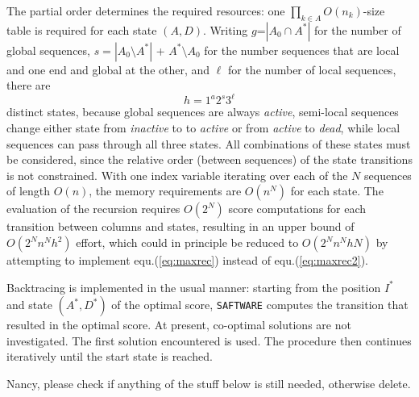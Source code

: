 \documentclass[a4paper,10pt]{article}
\newcommand{\TODO}[1]{\begingroup\color{red}#1\endgroup}
\newcommand{\PFS}[1]{\begingroup\color{green}#1\endgroup}
\newcommand{\SAFTWARE}{\TODO{\texttt{SAFTWARE}}}
\begin{document}
The partial order determines the required resources: one
$\prod_{k\in A} O(n_k)$-size table is required for each state $(A,D)$.
Writing $g$=$|A_0\cap A^*|$ for the number of global sequences,
$s=|A_0\setminus A^*|$ + $A^*\setminus A_0$ for the number sequences that
are local and one end and global at the other, and $\ell$ for the number of
local sequences, there are
\begin{equation}
  h = 1^a 2^s 3^{\ell} 
\end{equation} 
distinct states, because global sequences are always \textit{active},
semi-local sequences change either state from \textit{inactive} to to
\textit{active} or from \textit{active} to \textit{dead}, while local
sequences can pass through all three states. All combinations of these
states must be considered, since the relative order (between sequences) of
the state transitions is not constrained.  \PFS{With one index variable
  iterating over each of the $N$ sequences of length $O(n)$, the memory
  requirements are $O(n^N)$ for each state.  The evaluation of the
  recursion requires $O(2^N)$ score computations for each transition
  between columns and states, resulting in an upper bound of
  $O(2^N n^N h^2)$ effort, which could in principle be reduced to
  $O(2^N n^N h N)$ by attempting to implement equ.(\ref{eq:maxrec})
  instead of equ.(\ref{eq:maxrec2}).}

\PFS{Backtracing is implemented in the usual manner: starting from the
  position $I^*$ and state $(A^*,D^*)$ of the optimal score, \SAFTWARE{}
  computes the transition that resulted in the optimal score. At present,
  co-optimal solutions are not investigated. The first solution encountered
  is used. The procedure then continues iteratively until the start state
  is reached.}

\TODO{Nancy, please check if anything of the stuff below is still needed,
  otherwise delete.}
\end{document}
